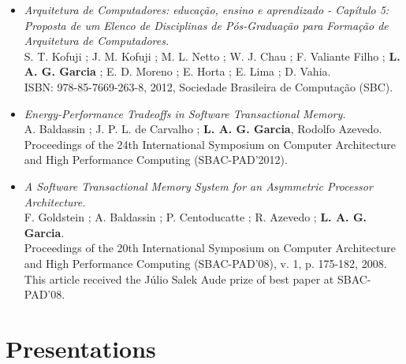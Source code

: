 \documentclass[10pt]{article} %
\begin{document}
\begin{itemize}
 \item \textit{Arquitetura de Computadores: educação, ensino e aprendizado - Capítulo 5: Proposta de um Elenco de Disciplinas de Pós-Graduação para Formação de Arquitetura de Computadores.} \\
  S. T. Kofuji ; J. M. Kofuji ; M. L. Netto ; W. J. Chau ; F. Valiante Filho ; \textbf{L. A. G. Garcia} ; E. D. Moreno ; E. Horta ; E. Lima ; D. Vahia.  \\
  ISBN: 978-85-7669-263-8, 2012, Sociedade Brasileira de Computação (SBC).
 \item \textit{Energy-Performance Tradeoffs in Software Transactional Memory.} \\
  A. Baldassin ; J. P. L. de Carvalho ; \textbf{L. A. G. Garcia}, Rodolfo Azevedo. \\
  Proceedings of the 24th International Symposium on Computer Architecture and High Performance Computing (SBAC-PAD'2012).
 \item \textit{A Software Transactional Memory System for an Asymmetric Processor Architecture.} \\
  F. Goldstein ; A. Baldassin ; P. Centoducatte ; R. Azevedo ; \textbf{L. A. G. Garcia}. \\
  Proceedings of the 20th International Symposium on Computer Architecture and High Performance Computing (SBAC-PAD'08), v. 1, p. 175-182, 2008. \\
  This article received the Júlio Salek Aude prize of best paper at SBAC-PAD’08.
\end{itemize}


\section{Presentations}
\end{document}
